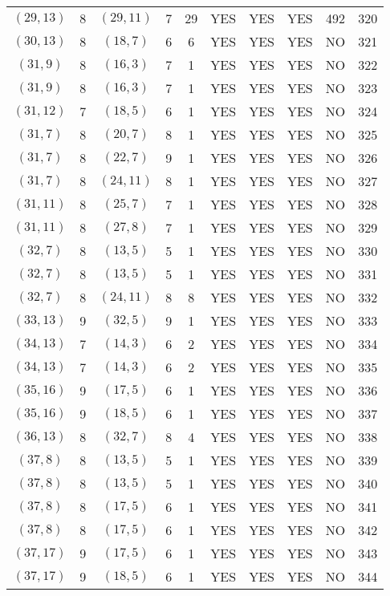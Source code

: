 \begin{longtable}{|c|c|c|c|c|c|c|c|c|c|}
$(29, 13)$ & 8 & $(29, 11)$ & 7 & 29 & YES & YES & YES & 492 & 320\\
$(30, 13)$ & 8 & $(18, 7)$ & 6 & 6 & YES & YES & YES & NO & 321\\
$(31, 9)$ & 8 & $(16, 3)$ & 7 & 1 & YES & YES & YES & NO & 322\\
$(31, 9)$ & 8 & $(16, 3)$ & 7 & 1 & YES & YES & YES & NO & 323\\
$(31, 12)$ & 7 & $(18, 5)$ & 6 & 1 & YES & YES & YES & NO & 324\\
$(31, 7)$ & 8 & $(20, 7)$ & 8 & 1 & YES & YES & YES & NO & 325\\
$(31, 7)$ & 8 & $(22, 7)$ & 9 & 1 & YES & YES & YES & NO & 326\\
$(31, 7)$ & 8 & $(24, 11)$ & 8 & 1 & YES & YES & YES & NO & 327\\
$(31, 11)$ & 8 & $(25, 7)$ & 7 & 1 & YES & YES & YES & NO & 328\\
$(31, 11)$ & 8 & $(27, 8)$ & 7 & 1 & YES & YES & YES & NO & 329\\
$(32, 7)$ & 8 & $(13, 5)$ & 5 & 1 & YES & YES & YES & NO & 330\\
$(32, 7)$ & 8 & $(13, 5)$ & 5 & 1 & YES & YES & YES & NO & 331\\
$(32, 7)$ & 8 & $(24, 11)$ & 8 & 8 & YES & YES & YES & NO & 332\\
$(33, 13)$ & 9 & $(32, 5)$ & 9 & 1 & YES & YES & YES & NO & 333\\
$(34, 13)$ & 7 & $(14, 3)$ & 6 & 2 & YES & YES & YES & NO & 334\\
$(34, 13)$ & 7 & $(14, 3)$ & 6 & 2 & YES & YES & YES & NO & 335\\
$(35, 16)$ & 9 & $(17, 5)$ & 6 & 1 & YES & YES & YES & NO & 336\\
$(35, 16)$ & 9 & $(18, 5)$ & 6 & 1 & YES & YES & YES & NO & 337\\
$(36, 13)$ & 8 & $(32, 7)$ & 8 & 4 & YES & YES & YES & NO & 338\\
$(37, 8)$ & 8 & $(13, 5)$ & 5 & 1 & YES & YES & YES & NO & 339\\
$(37, 8)$ & 8 & $(13, 5)$ & 5 & 1 & YES & YES & YES & NO & 340\\
$(37, 8)$ & 8 & $(17, 5)$ & 6 & 1 & YES & YES & YES & NO & 341\\
$(37, 8)$ & 8 & $(17, 5)$ & 6 & 1 & YES & YES & YES & NO & 342\\
$(37, 17)$ & 9 & $(17, 5)$ & 6 & 1 & YES & YES & YES & NO & 343\\
$(37, 17)$ & 9 & $(18, 5)$ & 6 & 1 & YES & YES & YES & NO & 344\\

\end{longtable}
